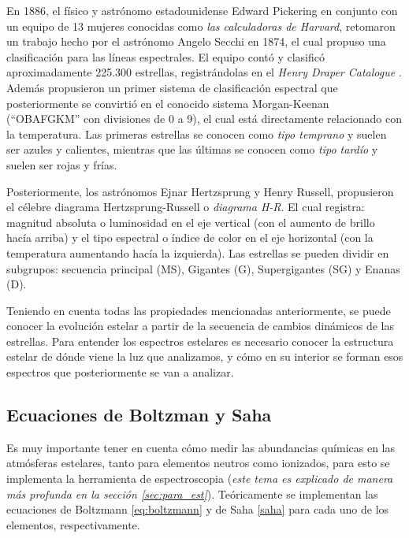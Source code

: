 \documentclass[12pt,oneside,openany,letter]{book}
\begin{document}
\noindent En 1886, el físico y astrónomo estadounidense Edward Pickering en conjunto con un equipo de 13 mujeres conocidas como \textit{las calculadoras de Harvard}, retomaron un trabajo hecho por el astrónomo Angelo Secchi en 1874, el cual propuso una clasificación para las líneas espectrales. El equipo contó y clasificó aproximadamente 225.300 estrellas, registrándolas en el \textit{Henry Draper Catalogue} \citep{gray2009stellar}. Además propusieron un primer sistema de clasificación espectral que posteriormente se convirtió en el conocido sistema Morgan-Keenan (``OBAFGKM'' con divisiones de 0 a 9), el cual está directamente relacionado con la temperatura. Las primeras estrellas se conocen como \textit{tipo temprano} y suelen ser azules y calientes, mientras que las últimas se conocen como \textit{tipo tardío} y suelen ser rojas y frías.
\vspace{2mm}

\noindent Posteriormente, los astrónomos Ejnar Hertzsprung y Henry Russell, propusieron el célebre diagrama Hertzsprung-Russell o \textit{diagrama H-R}. El cual registra: magnitud absoluta o luminosidad en el eje vertical (con el aumento de brillo hacía arriba) y el tipo espectral o índice de color en el eje horizontal (con la temperatura aumentando hacía la izquierda). Las estrellas se pueden dividir en subgrupos: secuencia principal (MS), Gigantes (G), Supergigantes (SG) y Enanas (D).

\noindent Teniendo en cuenta todas las propiedades mencionadas anteriormente, se puede conocer la evolución estelar a partir de la secuencia de cambios dinámicos de las estrellas. Para entender los espectros estelares es necesario conocer la estructura estelar de dónde viene la luz que analizamos, y cómo en su interior se forman esos espectros que posteriormente se van a analizar.


\subsection{Ecuaciones de Boltzman y Saha}


\noindent Es muy importante tener en cuenta cómo medir las abundancias químicas en las atmósferas estelares, tanto para elementos neutros como ionizados, para esto se implementa la herramienta de espectroscopia (\textit{este tema es explicado de manera más profunda en la sección \ref{sec:para_est}}).  Teóricamente se implementan las ecuaciones de Boltzmann \ref{eq:boltzmann} y de Saha \ref{saha} para cada uno de los elementos, respectivamente.
\vspace{2mm}
\end{document}

